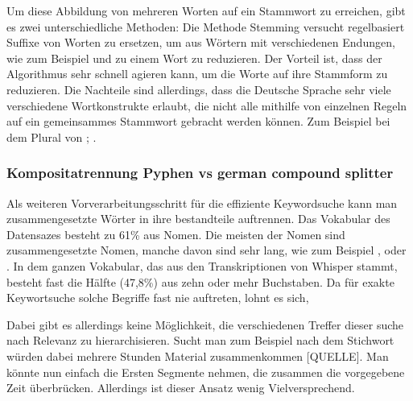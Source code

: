 Um diese Abbildung von mehreren Worten auf ein Stammwort zu erreichen, gibt es zwei unterschiedliche Methoden:
Die Methode Stemming versucht regelbasiert Suffixe von Worten zu ersetzen, um aus Wörtern mit verschiedenen Endungen, wie zum Beispiel  und  zu einem Wort  zu reduzieren.
Der Vorteil ist, dass der Algorithmus sehr schnell agieren kann, um die Worte auf ihre Stammform zu reduzieren.
Die Nachteile sind allerdings, dass die Deutsche Sprache sehr viele verschiedene Wortkonstrukte erlaubt, die nicht alle mithilfe von einzelnen Regeln auf ein gemeinsammes Stammwort gebracht werden können. 
Zum Beispiel bei dem Plural von ; .


\subsubsection{Kompositatrennung Pyphen vs german compound splitter}

Als weiteren Vorverarbeitungsschritt für die effiziente Keywordsuche kann man zusammengesetzte Wörter in ihre bestandteile auftrennen.
Das Vokabular des Datensazes besteht zu 61\% aus Nomen. 
Die meisten der Nomen sind zusammengesetzte Nomen, manche davon sind sehr lang, wie zum Beispiel , oder .
In dem ganzen Vokabular, das aus den Transkriptionen von Whisper stammt, besteht fast die Hälfte (47,8\%) aus zehn oder mehr Buchstaben.
Da für exakte Keywortsuche solche Begriffe fast nie auftreten, lohnt es sich, 



Dabei gibt es allerdings keine Möglichkeit, die verschiedenen Treffer dieser suche nach Relevanz zu hierarchisieren. Sucht man zum Beispiel nach dem Stichwort  würden dabei mehrere Stunden Material zusammenkommen [QUELLE]. 
Man könnte nun einfach die Ersten Segmente nehmen, die zusammen die vorgegebene Zeit überbrücken. 
Allerdings ist dieser Ansatz wenig Vielversprechend. 



